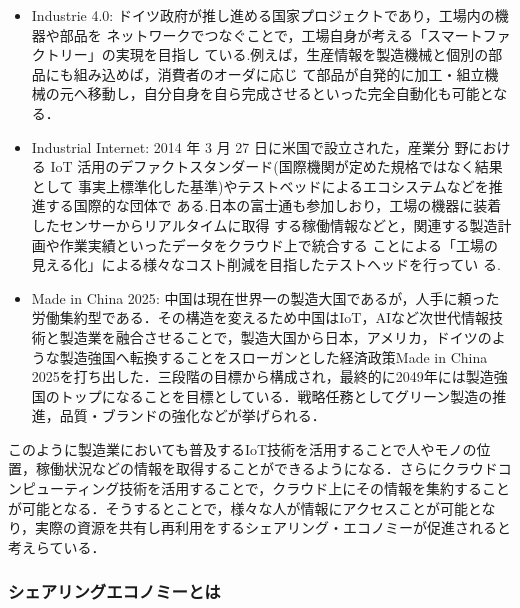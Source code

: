 \begin{itemize}
\tightlist
\item
  Industrie 4.0\cite{Industrie4.0}:
  ドイツ政府が推し進める国家プロジェクトであり，工場内の機器や部品を
  ネットワークでつなぐことで，工場自身が考える「スマートファクトリー」の実現を目指し
  ている.例えば，生産情報を製造機械と個別の部品にも組み込めば，消費者のオーダに応じ
  て部品が自発的に加工・組立機械の元へ移動し，自分自身を自ら完成させるといった完全自動化も可能となる．
\item
  Industrial Internet\cite{IIC}: 2014 年 3 月 27
  日に米国で設立された，産業分 野における IoT
  活用のデファクトスタンダード(国際機関が定めた規格ではなく結果として
  事実上標準化した基準)やテストベッドによるエコシステムなどを推進する国際的な団体で
  ある.日本の富士通も参加しおり，工場の機器に装着したセンサーからリアルタイムに取得
  する稼働情報などと，関連する製造計画や作業実績といったデータをクラウド上で統合する
  ことによる「工場の見える化」による様々なコスト削減を目指したテストヘッドを行ってい
  る\cite{fujitsu}.
\item
  Made in China 2025\cite{china2025}:
  中国は現在世界一の製造大国であるが，人手に頼った労働集約型である．その構造を変えるため中国はIoT，AIなど次世代情報技術と製造業を融合させることで，製造大国から日本，アメリカ，ドイツのような製造強国へ転換することをスローガンとした経済政策Made
  in China
  2025を打ち出した．三段階の目標から構成され，最終的に2049年には製造強国のトップになることを目標としている．戦略任務としてグリーン製造の推進，品質・ブランドの強化などが挙げられる\cite{chaina2025-web}．
\end{itemize}

このように製造業においても普及するIoT技術を活用することで人やモノの位置，稼働状況などの情報を取得することができるようになる．さらにクラウドコンピューティング技術を活用することで，クラウド上にその情報を集約することが可能となる．そうするとことで，様々な人が情報にアクセスことが可能となり，実際の資源を共有し再利用をするシェアリング・エコノミーが促進されると考えらている\cite{Soumu-sharing}．

\hypertarget{ux30b7ux30a7ux30a2ux30eaux30f3ux30b0ux30a8ux30b3ux30ceux30dfux30fcux3068ux306f}{%
\subsubsection{シェアリングエコノミーとは}\label{ux30b7ux30a7ux30a2ux30eaux30f3ux30b0ux30a8ux30b3ux30ceux30dfux30fcux3068ux306f}}

